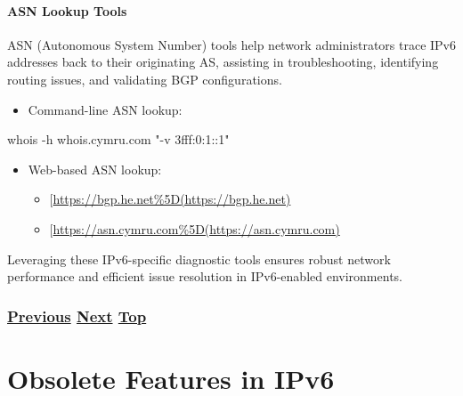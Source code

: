 \documentclass[
]{article}
\newenvironment{Shaded}{}{}
\newcommand{\AttributeTok}[1]{\textcolor[rgb]{0.49,0.56,0.16}{#1}}
\newcommand{\ExtensionTok}[1]{#1}
\newcommand{\NormalTok}[1]{#1}
\newcommand{\StringTok}[1]{\textcolor[rgb]{0.25,0.44,0.63}{#1}}
\providecommand{\tightlist}{%
  \setlength{\itemsep}{0pt}\setlength{\parskip}{0pt}}
\begin{document}
\paragraph{ASN Lookup Tools}\label{asn-lookup-tools}

ASN (Autonomous System Number) tools help network administrators trace
IPv6 addresses back to their originating AS, assisting in
troubleshooting, identifying routing issues, and validating BGP
configurations.

\begin{itemize}
\tightlist
\item
  Command-line ASN lookup:
\end{itemize}

\begin{Shaded}
\begin{Highlighting}[]
\ExtensionTok{whois} \AttributeTok{{-}h}\NormalTok{ whois.cymru.com }\StringTok{"{-}v 3fff:0:1::1"}
\end{Highlighting}
\end{Shaded}

\begin{itemize}
\tightlist
\item
  Web-based ASN lookup:

  \begin{itemize}
  \tightlist
  \item
    {[}\url{https://bgp.he.net\%5D(https://bgp.he.net)}
  \item
    {[}\url{https://asn.cymru.com\%5D(https://asn.cymru.com)}
  \end{itemize}
\end{itemize}

Leveraging these IPv6-specific diagnostic tools ensures robust network
performance and efficient issue resolution in IPv6-enabled environments.

\subsubsection{\texorpdfstring{\hyperref[advanced-troubleshooting]{Previous}
\hyperref[obsolete-features-in-ipv6]{Next}
\hyperref[troubleshooting]{Top}}{Previous Next Top}}\label{previous-next-top-38}

\pagebreak

\section{Obsolete Features in IPv6}\label{obsolete-features-in-ipv6}
\end{document}
